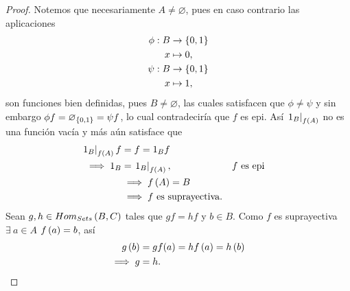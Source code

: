 \documentclass{article}
\begin{document}
\begin{lem}
\begin{proof}
			 Notemos que necesariamente $A\neq\varnothing$, pues en caso contrario las aplicaciones
			\begin{align*}
				\phi: B &\rightarrow \left\{0,1\right\}\\ x &\mapsto 0,\\
				\psi: B &\rightarrow \left\{0,1\right\}\\ x &\mapsto 1,
			\end{align*}			
			 son funciones bien definidas, pues $B\neq\varnothing$, las cuales satisfacen que $\phi\neq\psi$ y sin embargo $\phi f=\varnothing_{\left\{0,1\right\}}=\psi f$, lo cual contradeciría que $f$ es epi. Así $\left.1_B\right|_{f\left(A\right)}$ no es una función vacía y más aún satisface que
			\begin{align*}
				\left.1_B\right|_{f\left(A\right)}f&=f=1_B f\\
				\implies 1_B&=\left.1_B\right|_{f\left(A\right)}, && f\text{ es epi}\\
				&\implies f\left(A\right)=B\\
				&\implies f\text{ es suprayectiva.}
			\end{align*}
		 Sean $g,h\in Hom_{Sets}\left(B,C\right)$ tales que $gf=hf$ y $b\in B$. Como $f$ es suprayectiva $\exists\ a\in A$ $f\left(a\right)=b$, así
		\begin{align*}
			g\left(b\right)&=gf(a)=hf\left(a\right)=h\left(b\right)\\
			\implies g&=h.
		\end{align*}
		\end{proof}
	\end{lem}
	
\end{document}
